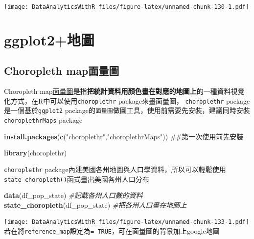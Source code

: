 \documentclass[]{book}
\newenvironment{Shaded}{\begin{snugshade}}{\end{snugshade}}
\newcommand{\KeywordTok}[1]{\textcolor[rgb]{0.13,0.29,0.53}{\textbf{{#1}}}}
\newcommand{\StringTok}[1]{\textcolor[rgb]{0.31,0.60,0.02}{{#1}}}
\newcommand{\CommentTok}[1]{\textcolor[rgb]{0.56,0.35,0.01}{\textit{{#1}}}}
\newcommand{\NormalTok}[1]{{#1}}
\theoremstyle{definition}
\theoremstyle{definition}
\theoremstyle{remark}
\begin{document}
\texttt{[image: DataAnalyticsWithR\_files/figure-latex/unnamed-chunk-130-1.pdf]}

\section{ggplot2+地圖}\label{ggplot2}

\subsection{Choropleth map面量圖}\label{choropleth-map}

Choropleth
map\href{https://en.wikipedia.org/wiki/Choropleth_map}{面量圖}是指\textbf{把統計資料用顏色畫在對應的地圖上}的一種資料視覺化方式，在R中可以使用\texttt{choroplethr}\citep{R-choroplethr}
package來畫面量圖， \texttt{choroplethr}
package是一個基於\texttt{ggplot2}
package的\texttt{面量圖}做圖工具，使用前需要先安裝，建議同時安裝\texttt{choroplethrMaps}
package

\begin{Shaded}
\begin{Highlighting}[]
\KeywordTok{install.packages}\NormalTok{(}\KeywordTok{c}\NormalTok{(}\StringTok{"choroplethr"}\NormalTok{,}\StringTok{"choroplethrMaps"}\NormalTok{)) ##第一次使用前先安裝}
\end{Highlighting}
\end{Shaded}

\begin{Shaded}
\begin{Highlighting}[]
\KeywordTok{library}\NormalTok{(choroplethr)}
\end{Highlighting}
\end{Shaded}

\texttt{choroplethr}\citep{R-choroplethr}
package內建美國各州地圖與人口學資料，所以可以輕鬆使用\texttt{state\_choropleth()}函式畫出美國各州人口分布

\begin{Shaded}
\begin{Highlighting}[]
\KeywordTok{data}\NormalTok{(df_pop_state) }\CommentTok{#記載各州人口數的資料}
\KeywordTok{state_choropleth}\NormalTok{(df_pop_state) }\CommentTok{#把各州人口畫在地圖上}
\end{Highlighting}
\end{Shaded}

\texttt{[image: DataAnalyticsWithR\_files/figure-latex/unnamed-chunk-133-1.pdf]}
若在將\texttt{reference\_map}設定為\texttt{=\ TRUE}，可在面量圖的背景加上google地圖
\end{document}
